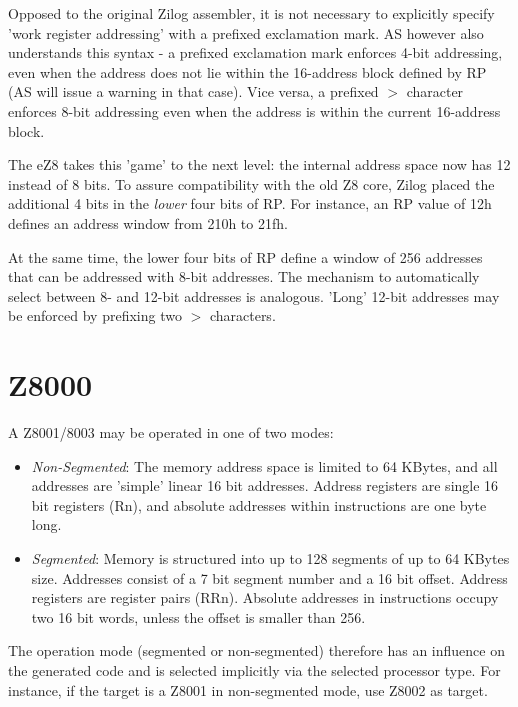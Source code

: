 \documentclass[12pt,twoside]{report}
\newcommand{\asname}{{AS}}
\begin{document}
Opposed to the original Zilog assembler, it is not necessary to
explicitly specify 'work register addressing' with a prefixed
exclamation mark.  \asname{} however also understands this syntax - a
prefixed exclamation mark enforces 4-bit addressing, even when the
address does not lie within the 16-address block defined by RP (\asname{} will
issue a warning in that case).  Vice versa, a prefixed $>$
character enforces 8-bit addressing even when the address is within
the current 16-address block.

The eZ8 takes this 'game' to the next level: the internal address
space now has 12 instead of 8 bits.  To assure compatibility with the
old Z8 core, Zilog placed the additional 4 bits in the {\em lower}
four bits of RP.  For instance, an RP value of 12h defines an address
window from 210h to 21fh.

At the same time, the lower four bits of RP define a window of 256
addresses that can be addressed with 8-bit addresses.  The mechanism
to automatically select between 8- and 12-bit addresses is analogous.
'Long' 12-bit addresses may be enforced by prefixing two $>$
characters.


\section{Z8000}
\label{Z8000Spec}

A Z8001/8003 may be operated in one of two modes:

\begin{itemize}
\item{{\em Non-Segmented}: The memory address space is limited to 64 KBytes,
      and all addresses are 'simple' linear 16 bit addresses.  Address
      registers are single 16 bit registers (Rn), and absolute addresses
      within instructions are one byte long.}
\item{{\em Segmented}: Memory is structured into up to 128 segments of up
      to 64 KBytes size.  Addresses consist of a 7 bit segment number and a
      16 bit offset. Address registers are register pairs (RRn).  Absolute
      addresses in instructions occupy two 16 bit words, unless the offset
      is smaller than 256.}
\end{itemize}

The operation mode (segmented or non-segmented) therefore has an influence
on the generated code and is selected implicitly via the selected processor
type.  For instance, if the target is a Z8001 in non-segmented mode, use
Z8002 as target.
\end{document}
